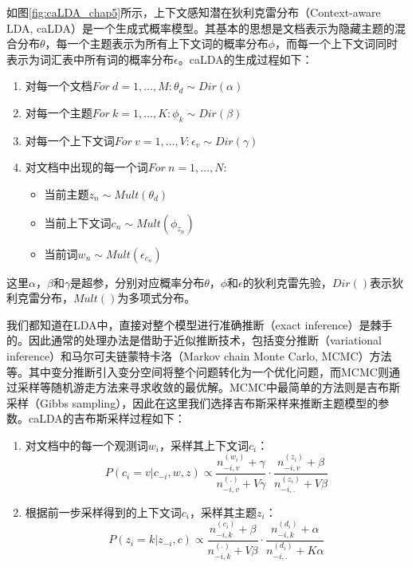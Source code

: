 \documentclass[master]{njuthesis}
\begin{document}
如图\ref{fig:caLDA_chap5}所示，上下文感知潜在狄利克雷分布（Context-aware LDA, caLDA）是一个生成式概率模型。其基本的思想是文档表示为隐藏主题的混合分布$\theta$，每一个主题表示为所有上下文词的概率分布$\phi$，而每一个上下文词同时表示为词汇表中所有词的概率分布$\epsilon$。caLDA的生成过程如下：
	\begin{enumerate}
	\item 对每一个文档$For\ d=1, ..., M: \theta_{d}\sim Dir(\alpha)$
	\item 对每一个主题$For\ k=1, ..., K: \phi_{k}\sim Dir(\beta)$
	\item 对每一个上下文词$For\ v=1, ..., V: \epsilon_{v}\sim Dir(\gamma)$
	\item 对文档中出现的每一个词$For\ n=1, ..., N:$
		\begin{itemize}
		\item 当前主题$z_{n}\sim Mult(\theta_{d})$
		\item 当前上下文词$c_{n}\sim Mult(\phi_{z_{n}})$
		\item 当前词$w_{n}\sim Mult(\epsilon_{c_{n}})$
		\end{itemize}
	\end{enumerate}
这里$\alpha$，$\beta$和$\gamma$是超参，分别对应概率分布$\theta$，$\phi$和$\epsilon$的狄利克雷先验，$Dir()$表示狄利克雷分布，$Mult()$为多项式分布。

我们都知道在LDA中，直接对整个模型进行准确推断（exact inference）是棘手的\cite{blei2003latent}。因此通常的处理办法是借助于近似推断技术，包括变分推断（variational inference）和马尔可夫链蒙特卡洛（Markov chain Monte Carlo, MCMC）方法等。其中变分推断引入变分空间将整个问题转化为一个优化问题，而MCMC则通过采样等随机游走方法来寻求收敛的最优解。MCMC中最简单的方法则是吉布斯采样（Gibbs sampling），因此在这里我们选择吉布斯采样来推断主题模型的参数\cite{griffiths2004finding}。caLDA的吉布斯采样过程如下：
	\begin{enumerate}
	\item 	对文档中的每一个观测词$w_i$，采样其上下文词$c_i$：
			\begin{equation}\label{eq:caLDA_gb_c_chap5}
			P(c_i=v|c_{-i}, w, z)\propto \frac{n_{-i, v}^{(w_i)}+\gamma}{n_{-i, v}^{(.)}+V\gamma}\cdot \frac{n_{-i, v}^{(z_i)}+\beta}{n_{-i, .}^{(z_i)}+V\beta}
			\end{equation}
	\item 	根据前一步采样得到的上下文词$c_i$，采样其主题$z_i$：
			\begin{equation}\label{eq:caLDA_gb_z_chap5}
			P(z_i=k|z_{-i}, c)\propto \frac{n_{-i, k}^{(c_i)}+\beta}{n_{-i, k}^{(.)}+V\beta}\cdot \frac{n_{-i, k}^{(d_i)}+\alpha}{n_{-i, .}^{(d_i)}+K\alpha}
			\end{equation}
	\end{enumerate}
\end{document}

